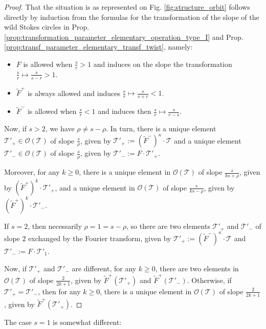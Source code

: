 \documentclass[11pt,a4paper]{amsart}
\numberwithin{equation}{section}
\begin{document}
\begin{proof}
That the situation is as represented on Fig. \ref{fig:structure_orbit} follows directly by induction from the formulas for the transformation of the slope of the wild Stokes circles in Prop. \ref{prop:transformation_parameter_elementary_operation_type_I} and Prop. \ref{prop:transf_parameter_elementary_transf_twist}, namely: 
\begin{itemize}
\item $F$ is allowed when $\frac{s}{r}>1$ and induces on the slope the transformation $\frac{s}{r}\mapsto \frac{s}{s-r}>1$.
\item $\widetilde{F}^{+}$ is always allowed and induces $\frac{s}{r}\mapsto \frac{s}{s+r}<1$.
\item $\widetilde{F}^{-}$ is allowed when $\frac{s}{r}<1$ and induces then $\frac{s}{r}\mapsto \frac{s}{r-s}$.
\end{itemize}
 
Now, if $s>2$, we have $\rho\neq s-\rho$. In turn, there is a unique element $\mathcal T'_+\in \mathcal O(\mathcal T)$ of slope $\frac{s}{\rho}$, given by  $\mathcal T'_+:=(\widetilde F^{-})^\kappa \cdot \mathcal T$ and a unique element $\mathcal T'_-\in \mathcal O(\mathcal T)$ of slope $\frac{s}{\rho}$, given  by $\mathcal T'_-:=F\cdot \mathcal T'_+$.

Moreover, for any $k\geq 0$, there is a unique element in $\mathcal O(\mathcal T)$ of slope $\frac{s}{ks+\rho}$, given by $(\widetilde F^+)^k\cdot \mathcal T'_+$, and a unique element in $\mathcal O(\mathcal T)$ of slope $\frac{s}{ks-\rho}$, given by $(\widetilde F^+)^k\cdot \mathcal T'_-$. 


If $s=2$, then necessarily $\rho=1=s-\rho$, so there are two elements $\mathcal T'_+$ and $\mathcal T'_-$ of slope $2$ exchanged by the Fourier transform, given by $\mathcal T'_+:=(\widetilde F^{-})^\kappa \cdot \mathcal T$ and $\mathcal T'_-:=F\cdot \mathcal T'_1$. 

Now, if $\mathcal T'_+$ and $\mathcal T'_-$ are different, for any $k\geq 0$, there are two elements in $\mathcal O(\mathcal T)$ of slope $\frac{2}{2k+1}$, given by $\widetilde F^+(\mathcal T'_+)$ and $\widetilde F^+(\mathcal T'_-)$. Otherwise, if $\mathcal T'_+=\mathcal T'_-$, then for any $k\geq 0$, there is a unique element in $\mathcal O(\mathcal T)$ of slope $\frac{2}{2k+1}$, given by $\widetilde F^+(\mathcal T'_+)$.
\end{proof}

The case $s=1$ is somewhat different:
\end{document}
